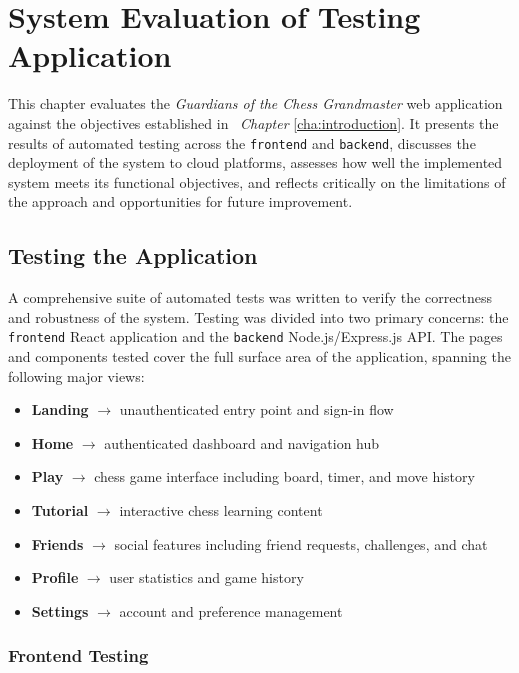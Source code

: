 \chapter{System Evaluation of Testing Application}
\label{cha:evaluation}

This chapter evaluates the \textit{Guardians of the Chess Grandmaster} web application against the objectives established in ~\textit{Chapter} \ref{cha:introduction}. It presents the results of automated testing across the \texttt{frontend} and \texttt{backend}, discusses the deployment of the system to cloud platforms, assesses how well the implemented system meets its functional objectives, and reflects critically on the limitations of the approach and opportunities for future improvement.

\section{Testing the Application}
\label{sec:testing}

A comprehensive suite of automated tests was written to verify the correctness and robustness of the system. Testing was divided into two primary concerns: the \texttt{frontend} React application and the \texttt{backend} Node.js/Express.js API. The pages and components tested cover the full surface area of the application, spanning the following major views:

\begin{itemize}
    \item \textbf{Landing} $\rightarrow$ unauthenticated entry point and sign-in flow
    \item \textbf{Home} $\rightarrow$ authenticated dashboard and navigation hub
    \item \textbf{Play} $\rightarrow$ chess game interface including board, timer, and move history
    \item \textbf{Tutorial} $\rightarrow$ interactive chess learning content
    \item \textbf{Friends} $\rightarrow$ social features including friend requests, challenges, and chat
    \item \textbf{Profile} $\rightarrow$ user statistics and game history
    \item \textbf{Settings} $\rightarrow$ account and preference management
\end{itemize}

\subsection*{Frontend Testing}

